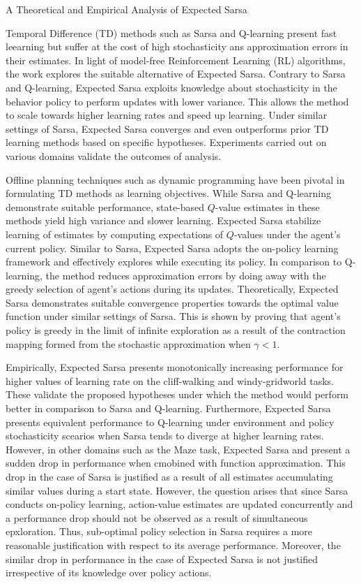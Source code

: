 \documentclass[11pt,letterpaper]{article}
\begin{document}
\begin{center}
  \large{A Theoretical and Empirical Analysis of Expected Sarsa}
\end{center}

Temporal Difference (TD) methods such as Sarsa and Q-learning present fast leearning but suffer at the cost of high stochasticity ans approximation errors in their estimates. In light of model-free Reinforcement Learning (RL) algorithms, the work explores the suitable alternative of Expected Sarsa. Contrary to Sarsa and Q-learning, Expected Sarsa exploits knowledge about stochasticity in the behavior policy to perform updates with lower variance. This allows the method to scale towards higher learning rates and speed up learning. Under similar settings of Sarsa, Expected Sarsa converges and even outperforms prior TD learning methods based on specific hypotheses. Experiments carried out on various domains validate the outcomes of analysis.

Offline planning techniques such as dynamic programming have been pivotal in formulating TD methods as learning objectives. While Sarsa and Q-learning demonstrate suitable performance, state-based $Q$-value estimates in these methods yield high variance and slower learning. Expected Sarsa stabilize learning of estimates by computing expectations of $Q$-values under the agent's current policy. Similar to Sarsa, Expected Sarsa adopts the on-policy learning framework and effectively explores while executing its policy. In comparison to Q-learning, the method reduces approximation errors by doing away with the greedy selection of agent's actions during its updates. Theoretically, Expected Sarsa demonstrates suitable convergence properties towards the optimal value function under similar settings of Sarsa. This is shown by proving that agent's policy is greedy in the limit of infinite exploration as a result of the contraction mapping formed from the stochastic approximation when $\gamma < 1$. 

Empirically, Expected Sarsa presents monotonically increasing performance for higher values of learning rate on the cliff-walking and windy-gridworld tasks. These validate the proposed hypotheses under which the method would perform better in comparison to Sarsa and Q-learning. Furthermore, Expected Sarsa presents equivalent performance to Q-learning under environment and policy stochasticity scearios when Sarsa tends to diverge at higher learning rates. However, in other domains such as the Maze task, Expected Sarsa and present a sudden drop in performance when cmobined with function approximation. This drop in the case of Sarsa is justified as a result of all estimates accumulating similar values during a start state. However, the question arises that since Sarsa conducts on-policy learning, action-value estimates are updated concurrently and a performance drop should not be observed as a result of simultaneous epxloration. Thus, sub-optimal policy selection in Sarsa requires a more reasonable justification with respect to its average performance. Moreover, the similar drop in performance in the case of Expected Sarsa is not justified irrespective of its knowledge over policy actions.  
\end{document}
